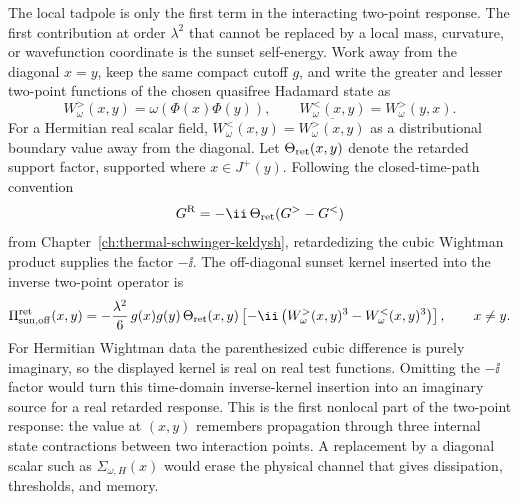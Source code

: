 The local tadpole is only the first term in the interacting two-point
response.  The first contribution at order \(\lambda^2\) that cannot be replaced
by a local mass, curvature, or wavefunction coordinate is the sunset
self-energy.  Work away from the diagonal \(x=y\), keep the same compact
cutoff \(g\), and write the greater and lesser two-point functions of the
chosen quasifree Hadamard state as
\[
  W_\omega^>(x,y)=\omega(\Phi(x)\Phi(y)),
  \qquad
  W_\omega^<(x,y)=W_\omega^>(y,x).
\]
For a Hermitian real scalar field,
\(W_\omega^<(x,y)=\overline{W_\omega^>(x,y)}\) as a distributional boundary
value away from the diagonal.  Let
\(\Theta_{\rm ret}(x,y)\) denote the retarded support factor, supported where
\(x\in J^+(y)\).  Following the closed-time-path convention
\[
  G^{\rm R}=-\ii\,\Theta_{\rm ret}(G^>-G^<)
\]
from Chapter~\ref{ch:thermal-schwinger-keldysh}, retardedizing the cubic
Wightman product supplies the factor \(-\ii\).  The off-diagonal sunset kernel
inserted into the inverse two-point operator is
\begin{equation}
  \Pi_{\rm sun,off}^{\rm ret}(x,y)
  =
  -\frac{\lambda^2}{6}\,
  g(x)g(y)\,
  \Theta_{\rm ret}(x,y)
  \left[-\ii
  \left(
    W_\omega^>(x,y)^3-W_\omega^<(x,y)^3
  \right)\right],
  \qquad x\ne y .
  \label{eq:paqft-sunset-retarded-kernel-offdiagonal}
\end{equation}
For Hermitian Wightman data the parenthesized cubic difference is purely
imaginary, so the displayed kernel is real on real test functions.  Omitting
the \(-\ii\) factor would turn this time-domain inverse-kernel insertion into
an imaginary source for a real retarded response.
This is the first nonlocal part of the two-point response: the value at
\((x,y)\) remembers propagation through three internal state contractions
between two interaction points.  A replacement by a diagonal scalar such as
\(\Sigma_{\omega,H}(x)\) would erase the physical channel that gives
dissipation, thresholds, and memory.

